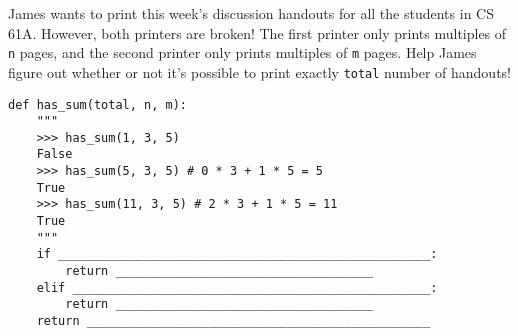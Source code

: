\begin{blocksection}
\question James wants to print this week's discussion handouts for all the students in CS 61A.
However, both printers are broken! The first printer only prints multiples of \lstinline$n$
pages, and the second printer only prints multiples of \lstinline$m$ pages. Help James figure
out whether or not it's possible to print exactly \lstinline$total$ number of handouts! \\

\begin{lstlisting}
def has_sum(total, n, m):
    """
    >>> has_sum(1, 3, 5)
    False
    >>> has_sum(5, 3, 5) # 0 * 3 + 1 * 5 = 5
    True
    >>> has_sum(11, 3, 5) # 2 * 3 + 1 * 5 = 11
    True
    """
    if ____________________________________________________:
        return ____________________________________
    elif __________________________________________________:
        return ____________________________________
    return ________________________________________________
    
\end{lstlisting}

\end{blocksection}
